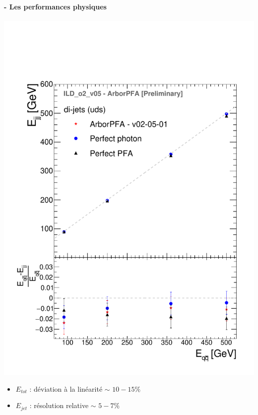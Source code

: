 \documentclass[8pt]{beamer}
\begin{document}
  \begin{frame}
  \frametitle{\secname}
  \framesubtitle{\subsecname - Les performances physiques}
    \begin{minipage}{0.49\linewidth}
      \begin{center}
        \includegraphics[width=\linewidth]{ILDArborPFA_ErecConfusions_NoNeutralHadron.pdf}
      \end{center}
    \end{minipage}
    \begin{minipage}{0.49\linewidth}
      \begin{itemize}
        \item \textbf{$E_{tot}$} : déviation à la linéarité $\sim$ $10-15\%$
        \item \textbf{$E_{jet}$} : résolution relative $\sim$ $5-7\%$
      \end{itemize}
      \begin{center}

\end{center}
\end{minipage}
\end{frame}
\end{document}
